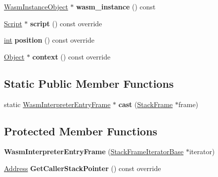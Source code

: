 \begin{DoxyCompactItemize}
\mbox{\hyperlink{classv8_1_1internal_1_1WasmInstanceObject}{Wasm\+Instance\+Object}} $\ast$ {\bfseries wasm\+\_\+instance} () const
\item 
\mbox{\label{classv8_1_1internal_1_1WasmInterpreterEntryFrame_ac5823c9d2eb0435b28ad27ca40c75622}} 
\mbox{\hyperlink{classv8_1_1internal_1_1Script}{Script}} $\ast$ {\bfseries script} () const override
\item 
\mbox{\label{classv8_1_1internal_1_1WasmInterpreterEntryFrame_a95ae9c36ef2c7ab8e3ba744419094146}} 
\mbox{\hyperlink{classint}{int}} {\bfseries position} () const override
\item 
\mbox{\label{classv8_1_1internal_1_1WasmInterpreterEntryFrame_ab1f8bbf4c62dd426e231229d2c7384e5}} 
\mbox{\hyperlink{classv8_1_1internal_1_1Object}{Object}} $\ast$ {\bfseries context} () const override
\end{DoxyCompactItemize}
\subsection*{Static Public Member Functions}
\begin{DoxyCompactItemize}
\item 
\mbox{\label{classv8_1_1internal_1_1WasmInterpreterEntryFrame_aaacaf33025b3d163e1f270a9a104ec05}} 
static \mbox{\hyperlink{classv8_1_1internal_1_1WasmInterpreterEntryFrame}{Wasm\+Interpreter\+Entry\+Frame}} $\ast$ {\bfseries cast} (\mbox{\hyperlink{classv8_1_1internal_1_1StackFrame}{Stack\+Frame}} $\ast$frame)
\end{DoxyCompactItemize}
\subsection*{Protected Member Functions}
\begin{DoxyCompactItemize}
\item 
\mbox{\label{classv8_1_1internal_1_1WasmInterpreterEntryFrame_a49315249319de582deab9e725fd5e632}} 
{\bfseries Wasm\+Interpreter\+Entry\+Frame} (\mbox{\hyperlink{classv8_1_1internal_1_1StackFrameIteratorBase}{Stack\+Frame\+Iterator\+Base}} $\ast$iterator)
\item 
\mbox{\label{classv8_1_1internal_1_1WasmInterpreterEntryFrame_a70a8464b2d9a649851a72ebfe8b36b65}} 
\mbox{\hyperlink{classuintptr__t}{Address}} {\bfseries Get\+Caller\+Stack\+Pointer} () const override
\end{DoxyCompactItemize}
